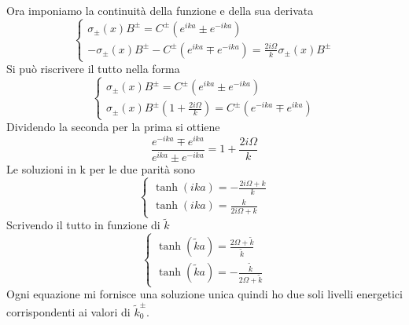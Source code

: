 \documentclass[a4paper]{article}
\begin{document}
        Ora imponiamo la continuità della funzione e della sua derivata 
        \begin{equation}
            \begin{cases}
                \sigma_\pm(x)B^\pm=C^\pm \left(e^{ika}\pm e^{-ika}\right)\\
                -\sigma_\pm(x)B^\pm-C^\pm \left(e^{ika}\mp e^{-ika}\right)=\frac{2i\Omega}{k}\sigma_\pm(x)B^\pm
            \end{cases}
        \end{equation}
        Si può riscrivere il tutto nella forma
        \begin{equation}
            \begin{cases}
                \sigma_\pm(x)B^\pm=C^\pm \left(e^{ika}\pm e^{-ika}\right)\\
                \sigma_\pm(x)B^\pm\left(1+\frac{2i\Omega}{k}\right)=C^\pm \left(e^{-ika}\mp e^{ika}\right)
            \end{cases}
        \end{equation}
        Dividendo la seconda per la prima si ottiene
        \begin{equation*}
            \frac{e^{-ika}\mp e^{ika}}{e^{ika}\pm e^{-ika}}=1+\frac{2i\Omega}{k}
        \end{equation*}
        Le soluzioni in k per le due parità sono
        \begin{equation}
            \begin{cases}
                \tanh(ika)=-\frac{2i\Omega+k}{k}\\
                \tanh(ika)=\frac{k}{2i\Omega+k}
            \end{cases}
        \end{equation}
        Scrivendo il tutto in funzione di $\tilde{k}$
        \begin{equation}
            \begin{cases}
                \tanh(\tilde{k}a)=\frac{2\Omega+\tilde{k}}{\tilde{k}}\\
                \tanh(\tilde{k}a)=-\frac{\tilde{k}}{2\Omega+\tilde{k}}
            \end{cases}
        \end{equation}
        Ogni equazione mi fornisce una soluzione unica quindi ho due soli livelli energetici corrispondenti ai valori di $\tilde{k}^\pm_0$.
\end{document}
